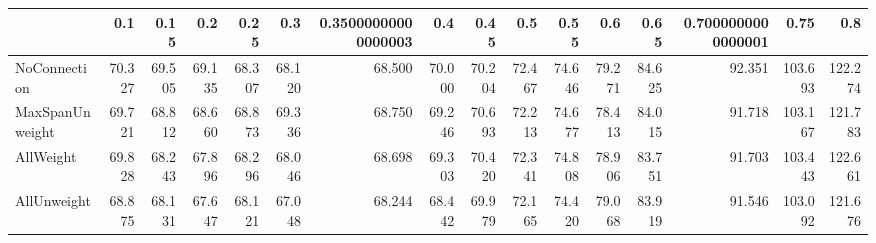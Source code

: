 \begin{tabular}{lrrrrrrrrrrrrrrr}
\toprule
{} &    0.1 &   0.15 &    0.2 &   0.25 &    0.3 & 0.35000000000000003 &    0.4 &   0.45 &    0.5 &   0.55 &    0.6 &   0.65 & 0.7000000000000001 &    0.75 &     0.8 \\
\midrule
NoConnection    & 70.327 & 69.505 & 69.135 & 68.307 & 68.120 &              68.500 & 70.000 & 70.204 & 72.467 & 74.646 & 79.271 & 84.625 &             92.351 & 103.693 & 122.274 \\
MaxSpanUnweight & 69.721 & 68.812 & 68.660 & 68.873 & 69.336 &              68.750 & 69.246 & 70.693 & 72.213 & 74.677 & 78.413 & 84.015 &             91.718 & 103.167 & 121.783 \\
AllWeight       & 69.828 & 68.243 & 67.896 & 68.296 & 68.046 &              68.698 & 69.303 & 70.420 & 72.341 & 74.808 & 78.906 & 83.751 &             91.703 & 103.443 & 122.661 \\
AllUnweight     & 68.875 & 68.131 & 67.647 & 68.121 & 67.048 &              68.244 & 68.442 & 69.979 & 72.165 & 74.420 & 79.068 & 83.919 &             91.546 & 103.092 & 121.676 \\
\bottomrule
\end{tabular}
